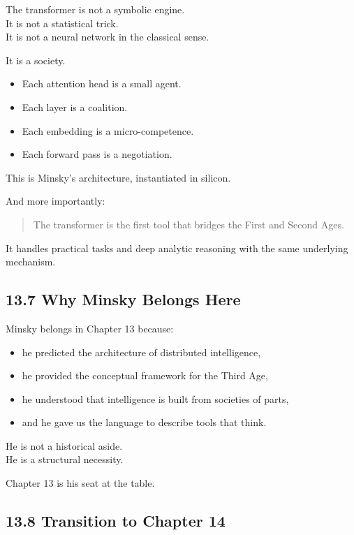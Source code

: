 \documentclass[
]{article}
\providecommand{\tightlist}{%
  \setlength{\itemsep}{0pt}\setlength{\parskip}{0pt}}
\begin{document}
The transformer is not a symbolic engine.\\
It is not a statistical trick.\\
It is not a neural network in the classical sense.

It is a society.

\begin{itemize}
\tightlist
\item
  Each attention head is a small agent.
\item
  Each layer is a coalition.
\item
  Each embedding is a micro-competence.
\item
  Each forward pass is a negotiation.
\end{itemize}

This is Minsky's architecture, instantiated in silicon.

And more importantly:

\begin{quote}
The transformer is the first tool that bridges the First and Second
Ages.
\end{quote}

It handles practical tasks and deep analytic reasoning with the same
underlying mechanism.

\hypertarget{why-minsky-belongs-here}{%
\subsection{13.7 Why Minsky Belongs
Here}\label{why-minsky-belongs-here}}

Minsky belongs in Chapter 13 because:

\begin{itemize}
\tightlist
\item
  he predicted the architecture of distributed intelligence,
\item
  he provided the conceptual framework for the Third Age,
\item
  he understood that intelligence is built from societies of parts,
\item
  and he gave us the language to describe tools that think.
\end{itemize}

He is not a historical aside.\\
He is a structural necessity.

Chapter 13 is his seat at the table.

\hypertarget{transition-to-chapter-14}{%
\subsection{13.8 Transition to Chapter
14}\label{transition-to-chapter-14}}
\end{document}
